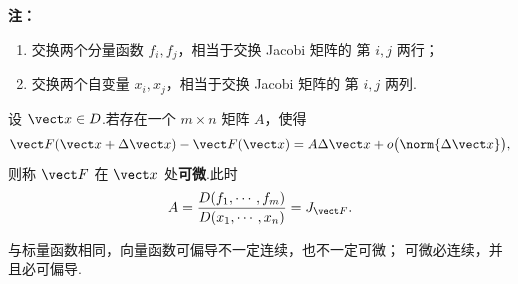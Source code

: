 \textbf{注：}
\begin{enumerate}
	\item 交换两个分量函数 $f_i,f_j$，相当于交换 Jacobi 矩阵的
	第 $i,j$ 两行；
	\item 交换两个自变量 $x_i,x_j$，相当于交换 Jacobi 矩阵的
	第 $i,j$ 两列.
\end{enumerate}

\begin{definition}
	设 $\vect x\in D$.若存在一个 $m\times n$ 矩阵 $A$，使得
	\[
	\vect F(\vect x+\Delta\vect x)-\vect F(\vect x)
	=
	A\Delta\vect x+o\bigl(\norm{\Delta\vect x}\bigr),
	\]
	则称 $\vect F$ 在 $\vect x$ 处\textbf{可微}.此时
	\[
	A
	=
	\frac{D(f_1,\cdots,f_m)}
	{D(x_1,\cdots,x_n)}
	=
	J_{\vect F}.
	\]
\end{definition}

与标量函数相同，向量函数可偏导不一定连续，也不一定可微；
可微必连续，并且必可偏导.

